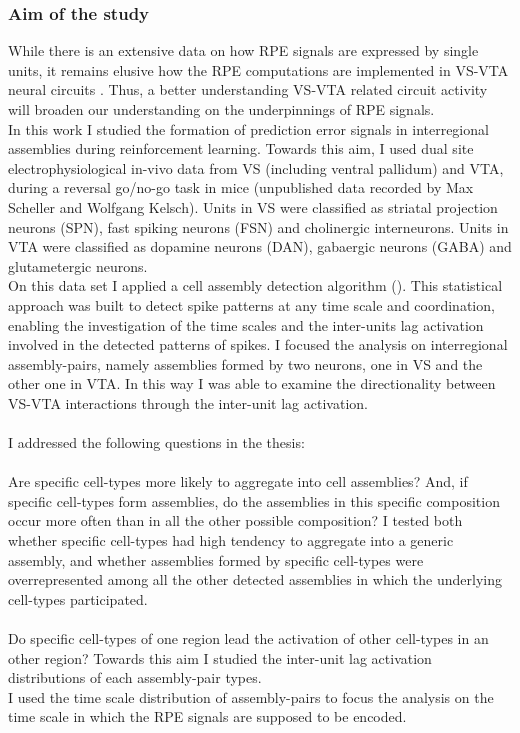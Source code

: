 \subsubsection{Aim of the study}
While there is an extensive data on how RPE signals are expressed by single units, it remains elusive how the RPE computations are implemented in VS-VTA neural circuits \cite{Schultz2016}. Thus, a better understanding VS-VTA related circuit activity will broaden our understanding on the underpinnings of RPE signals.\\In this work I studied the formation of prediction error signals in interregional assemblies during reinforcement learning. Towards this aim, I used dual site electrophysiological in-vivo data from VS (including ventral pallidum) and VTA, during a reversal go/no-go task in mice (unpublished data recorded by Max Scheller and Wolfgang Kelsch). Units in VS were classified as striatal projection neurons (SPN), fast spiking neurons (FSN) and cholinergic interneurons. Units in VTA were classified as dopamine neurons (DAN), gabaergic neurons (GABA) and glutametergic neurons.\\On this data set I applied a cell assembly detection algorithm (\cite{RussoDurstewitz}). This statistical approach was built to detect spike patterns at any time scale and coordination, enabling the investigation of the time scales and the inter-units lag activation involved in the detected patterns of spikes. I focused the analysis on interregional assembly-pairs, namely assemblies formed by two neurons, one in VS and the other one in VTA. In this way I was able to examine the directionality between VS-VTA interactions through the inter-unit lag activation.\\\\I addressed the following questions in the thesis:\\\\Are specific cell-types more likely to aggregate into cell assemblies? And, if specific cell-types form assemblies, do the assemblies in this specific composition occur more often than in all the other possible composition? I tested both whether specific cell-types had high tendency to aggregate into a generic assembly, and whether assemblies formed by specific cell-types were overrepresented among all the other detected assemblies in which the underlying cell-types participated.\\\\
Do specific cell-types of one region lead the activation of other cell-types in an other region? Towards this aim I studied the inter-unit lag activation distributions of each assembly-pair types.\\I used the time scale distribution of assembly-pairs to focus the analysis on the time scale in which the RPE signals are supposed to be encoded.\\\\\
